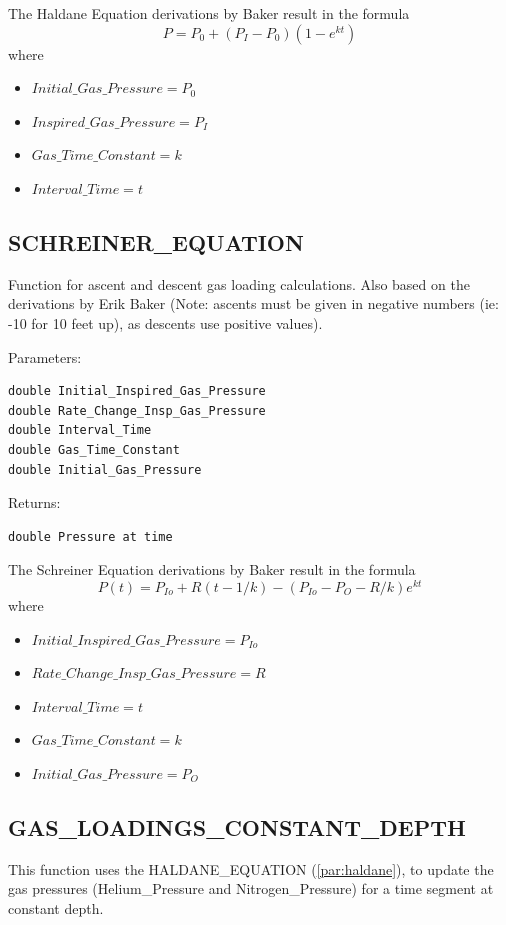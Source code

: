 \documentclass[12pt]{article}
\begin{document}
The Haldane Equation derivations by Baker result in the formula $$P = P_0 + (P_I - P_0)(1 - e^{kt})$$
where
\begin{itemize}
\item $ Initial\_Gas\_Pressure = P_0 $
\item $ Inspired\_Gas\_Pressure = P_I$
\item $ Gas\_Time\_Constant = k$
\item $ Interval\_Time = t$
\end{itemize}

\subsection{SCHREINER\_EQUATION}
\label{par:schreiner}
Function for ascent and descent gas loading calculations. Also based on the derivations
by Erik Baker\cite{baker_deriv} (Note: ascents must be given in negative numbers (ie: -10 for 10 feet up), as descents use positive values).

Parameters:
\begin{verbatim}
double Initial_Inspired_Gas_Pressure
double Rate_Change_Insp_Gas_Pressure
double Interval_Time
double Gas_Time_Constant
double Initial_Gas_Pressure
\end{verbatim}

Returns:
\begin{verbatim}
double Pressure at time
\end{verbatim}

The Schreiner Equation derivations by Baker result in the formula $$P(t) = P_{Io} + R(t - 1 / k) - (P_{Io} − P_O − R / k) e^{kt}$$
where
\begin{itemize}
\item $ Initial\_Inspired\_Gas\_Pressure = P_{Io}$
\item $ Rate\_Change\_Insp\_Gas\_Pressure = R$
\item $ Interval\_Time = t$
\item $ Gas\_Time\_Constant = k$
\item $ Initial\_Gas\_Pressure = P_O$
\end{itemize}

\subsection{GAS\_LOADINGS\_CONSTANT\_DEPTH}

This function uses the HALDANE\_EQUATION (\ref{par:haldane}), to update the
gas pressures (Helium\_Pressure and Nitrogen\_Pressure) for a time segment at constant depth.
\end{document}
